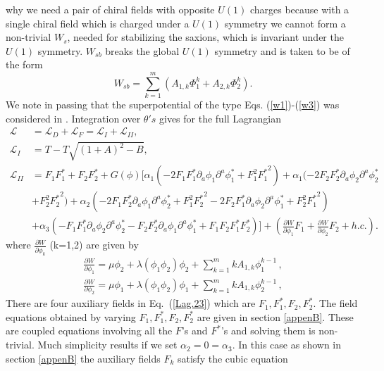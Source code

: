 \documentclass[a4paper,11pt]{article}
\def\non{\nonumber\\}
\def\non{\nonumber\\}
\begin{document}
  why we need a pair of chiral fields with opposite $U(1)$ charges because with a single chiral field which is
  charged under a $U(1)$ symmetry we cannot form a non-trivial $W_s$, needed for stabilizing the saxions,
  which is invariant under the
  $U(1)$ symmetry. $W_{sb}$ breaks the global $U(1)$ symmetry and is taken to be of the form
  \begin{equation}
    W_{sb}=\sum_{k=1}^m\left(A_{1, k}\Phi_1^k+A_{2, k}\Phi_2^k\right).
    \label{w3}
  \end{equation}
  We note in passing that the superpotential of the type Eqs. (\ref{w1})-(\ref{w3}) was considered in \cite{Nath:2017ihp,Halverson:2017deq}.
  Integration over $\theta's$ gives for the full Lagrangian
  \begin{align}
    \mathcal{L}
      &=   \mathcal{L}_D +  \mathcal{L}_F= \mathcal{L}_I + \mathcal{L}_{II},\non
    \mathcal{L}_I &= T - T \sqrt{(1+A)^2 - B},\non
    \mathcal{L}_{II}& = F_1 F^*_1 + F_2 F^*_2
      + G(\phi) \Big[ \alpha_1(-2 F_1 F^*_1 \partial_a\phi_1 \partial^a \phi^*_1
      + F_1^2 {F^*_1}^2)
      + \alpha_1 (-2 F_2 F^*_2 \partial_a\phi_2 \partial^a \phi^*_2 \non
    & + F_2^2 {F^*_2}^2)
      + \alpha_2 (-2 F_1 F^*_2 \partial_a\phi_1 \partial^a \phi^*_2
      + F_1^2 {F^*_2}^2 -2 F_2 F^*_1 \partial_a\phi_2 \partial^a \phi^*_1
      + F_2^2 {F^*_1}^2) \non
    & + \alpha_3(
      -F_1 F^*_1 \partial_a \phi_2 \partial^a \phi^*_2 - F_2 F^*_2 \partial_a \phi_1 \partial^a \phi^*_1
      + F_1 F_2 F^*_1 F^*_2) \Big]
      + \left(\frac{\partial W}{\partial \phi_1}F_1+ \frac{\partial W}{\partial \phi_2}F_2 + h.c.\right).
    \label{Lag.23}
  \end{align}
  where $\frac{\partial W}{\partial \phi_k}$ (k=1,2) are given by
  \begin{align}
   \frac{\partial W}{\partial \phi_1}= \mu \phi_2 + \lambda (\phi_1\phi_2) \phi_2 +\sum_{k=1}^m k A_{1,k} \phi_1^{k-1}\,,\nonumber\\
   \frac{\partial W}{\partial \phi_2}= \mu \phi_1 + \lambda (\phi_1\phi_2) \phi_1 +\sum_{k=1}^m k A_{1,k} \phi_2^{k-1}\,,  \nonumber
  \end{align}
  There are four auxiliary fields in Eq.~(\ref{Lag.23}) which are $F_1, F^*_1, F_2, F^*_2$. The field equations obtained by varying
  $F_1, F^*_1, F_2, F^*_2$ are given in section \ref{appenB}. These are coupled equations
  involving all the $F$'s and $F^*$'s
  and solving them is non-trivial. Much simplicity results if we set $ \alpha_2=0=\alpha_3$.
  In this case as
  shown in section \ref{appenB} the auxiliary fields $F_k$ satisfy the cubic equation
\end{document}

